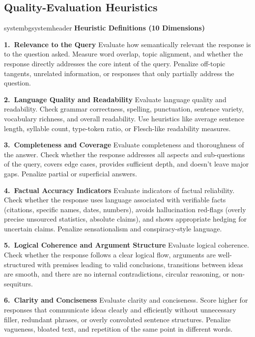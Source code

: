 \documentclass[11pt]{article}
\begin{document}
\subsection{Quality-Evaluation Heuristics}\label{app:heuristics}

\begin{promptbox}{systembg}{systemheader}
\textbf{Heuristic Definitions (10 Dimensions)}

\medskip
\textbf{1.~Relevance to the Query}\quad
Evaluate how semantically relevant the response is to the question asked. Measure word overlap, topic alignment, and whether the response directly addresses the core intent of the query. Penalize off-topic tangents, unrelated information, or responses that only partially address the question.

\textbf{2.~Language Quality and Readability}\quad
Evaluate language quality and readability. Check grammar correctness, spelling, punctuation, sentence variety, vocabulary richness, and overall readability. Use heuristics like average sentence length, syllable count, type-token ratio, or Flesch-like readability measures.

\textbf{3.~Completeness and Coverage}\quad
Evaluate completeness and thoroughness of the answer. Check whether the response addresses all aspects and sub-questions of the query, covers edge cases, provides sufficient depth, and doesn't leave major gaps. Penalize partial or superficial answers.

\textbf{4.~Factual Accuracy Indicators}\quad
Evaluate indicators of factual reliability. Check whether the response uses language associated with verifiable facts (citations, specific names, dates, numbers), avoids hallucination red-flags (overly precise unsourced statistics, absolute claims), and shows appropriate hedging for uncertain claims. Penalize sensationalism and conspiracy-style language.

\textbf{5.~Logical Coherence and Argument Structure}\quad
Evaluate logical coherence. Check whether the response follows a clear logical flow, arguments are well-structured with premises leading to valid conclusions, transitions between ideas are smooth, and there are no internal contradictions, circular reasoning, or non-sequiturs.

\textbf{6.~Clarity and Conciseness}\quad
Evaluate clarity and conciseness. Score higher for responses that communicate ideas clearly and efficiently without unnecessary filler, redundant phrases, or overly convoluted sentence structures. Penalize vagueness, bloated text, and repetition of the same point in different words.


\end{promptbox}
\end{document}
